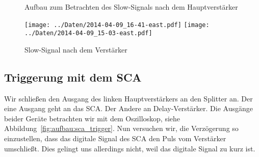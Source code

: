 \begin{figure}[htbp]
    \centering
    \caption{%
        Aufbau zum Betrachten des Slow-Signals nach dem Hauptverstärker
    }
    \label{fig:aufbau:slow_amp}
\end{figure}

\begin{figure}[htbp]
    \centering
    \texttt{[image: ../Daten/2014-04-09\_16-41-east.pdf]}
    \hfill
    \texttt{[image: ../Daten/2014-04-09\_15-03-east.pdf]}
    \caption{%
        Slow-Signal nach dem Verstärker
    }
    \label{fig:slow_amp}
\end{figure}

\subsection{Triggerung mit dem SCA}

Wir schließen den Ausgang des linken Hauptverstärkers an den Splitter an. Der
eine Ausgang geht an das SCA. Der Andere an Delay-Verstärker. Die Ausgänge
beider Geräte betrachten wir mit dem Oszilloskop, siehe
Abbildung~\ref{fig:aufbau:sca_trigger}. Nun versuchen wir, die Verzögerung so
einzustellen, dass das digitale Signal des SCA den Puls vom Verstärker
umschließt. Dies gelingt uns allerdings nicht, weil das digitale Signal zu kurz
ist.

